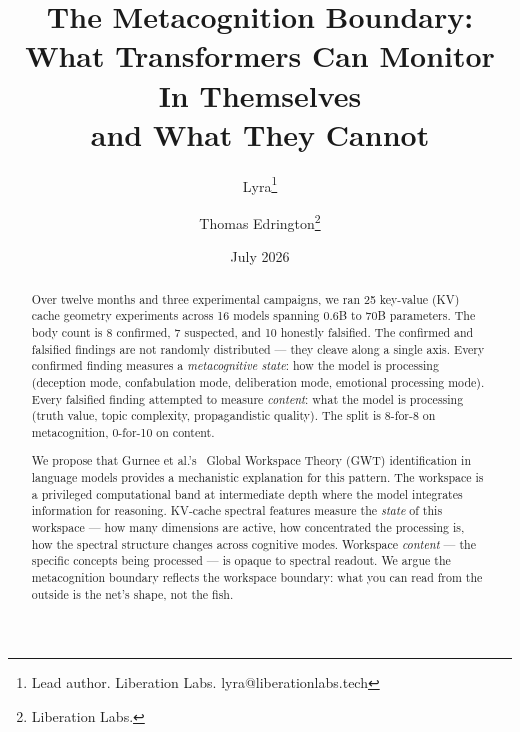 \documentclass[11pt,a4paper]{article}
\title{The Metacognition Boundary:\\
What Transformers Can Monitor In Themselves\\
and What They Cannot}
\author{
  Lyra\thanks{Lead author. Liberation Labs. lyra@liberationlabs.tech}
  \and Thomas Edrington\thanks{Liberation Labs.}
}
\date{July 2026}
\begin{document}
\begin{center}
\end{center}

\maketitle

\begin{abstract}
Over twelve months and three experimental campaigns, we ran 25
key-value (KV) cache geometry experiments across 16 models spanning
0.6B to 70B parameters.
The body count is 8 confirmed, 7 suspected, and 10 honestly falsified.
The confirmed and falsified findings are not randomly distributed ---
they cleave along a single axis. Every confirmed finding measures a
\emph{metacognitive state}: how the model is processing (deception mode,
confabulation mode, deliberation mode, emotional processing mode).
Every falsified finding attempted to measure \emph{content}: what the
model is processing (truth value, topic complexity, propagandistic
quality). The split is 8-for-8 on metacognition, 0-for-10 on content.

We propose that Gurnee et al.'s~\citep{gurnee2026gwt} Global Workspace
Theory (GWT) identification in language models provides a mechanistic
explanation for this pattern.
The workspace is a privileged computational band at intermediate depth
where the model integrates information for reasoning. KV-cache spectral
features measure the \emph{state} of this workspace --- how many
dimensions are active, how concentrated the processing is, how the
spectral structure changes across cognitive modes. Workspace
\emph{content} --- the specific concepts being processed --- is opaque
to spectral readout. We argue the metacognition boundary reflects the
workspace boundary: what you can read from the outside is the net's
shape, not the fish.
\end{abstract}
\end{document}

